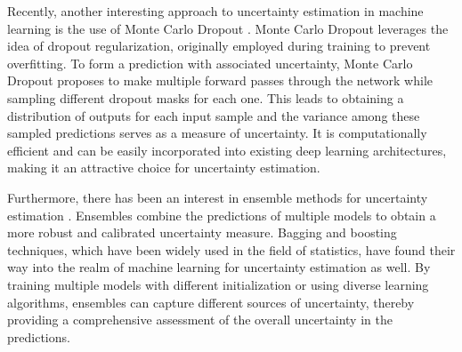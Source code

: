 Recently, another interesting approach to uncertainty estimation in machine learning is the use of Monte Carlo Dropout \cite{gal_dropout_2016}. Monte Carlo Dropout leverages the idea of dropout regularization, originally employed during training to prevent overfitting. To form a prediction with associated uncertainty, Monte Carlo Dropout proposes to make multiple forward passes through the network while sampling different dropout masks for each one. This leads to obtaining a distribution of outputs for each input sample and the variance among these sampled predictions serves as a measure of uncertainty. It is computationally efficient and can be easily incorporated into existing deep learning architectures, making it an attractive choice for uncertainty estimation.

Furthermore, there has been an interest in ensemble methods for uncertainty estimation \cite{lakshminarayanan_simple_2017}. Ensembles combine the predictions of multiple models to obtain a more robust and calibrated uncertainty measure. Bagging and boosting techniques, which have been widely used in the field of statistics, have found their way into the realm of machine learning for uncertainty estimation as well. By training multiple models with different initialization or using diverse learning algorithms, ensembles can capture different sources of uncertainty, thereby providing a comprehensive assessment of the overall uncertainty in the predictions.


